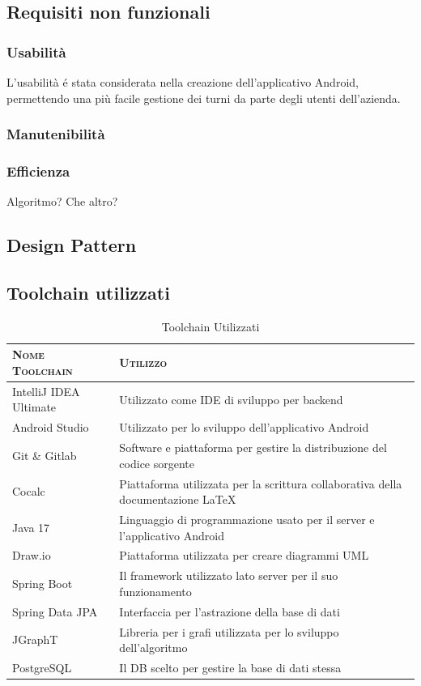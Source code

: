 \documentclass{article}
\begin{document}
\subsection{Requisiti non funzionali}
\subsubsection{Usabilità}
L'usabilità é stata considerata nella creazione dell'applicativo Android, permettendo una più facile gestione dei turni da parte degli utenti dell'azienda.
\subsubsection{Manutenibilità}
\subsubsection{Efficienza}
Algoritmo? Che altro?
\subsection{Design Pattern}
\subsection{Toolchain utilizzati}
\begin{table}[H]
\centering
\begin{tabular}[t]{ll}
\toprule
\textsc{Nome Toolchain} & \textsc{Utilizzo}\\\midrule
IntelliJ IDEA Ultimate & Utilizzato come IDE di sviluppo per backend\\
Android Studio & Utilizzato per lo sviluppo dell'applicativo Android\\
Git \& Gitlab & Software e piattaforma per gestire la distribuzione del codice sorgente\\
Cocalc & Piattaforma utilizzata per la scrittura collaborativa della documentazione \LaTeX\\
Java 17 & Linguaggio di programmazione usato per il server e l'applicativo Android \\
Draw.io & Piattaforma utilizzata per creare diagrammi UML\\
Spring Boot & Il framework utilizzato lato server per il suo funzionamento\\
Spring Data JPA & Interfaccia per l'astrazione della base di dati\\
JGraphT & Libreria per i grafi utilizzata per lo sviluppo dell'algoritmo\\
PostgreSQL & Il DB scelto per gestire la base di dati stessa \\\bottomrule
\end{tabular}
\caption{\label{tab:toolchain}Toolchain Utilizzati}
\end{table}
\end{document}
